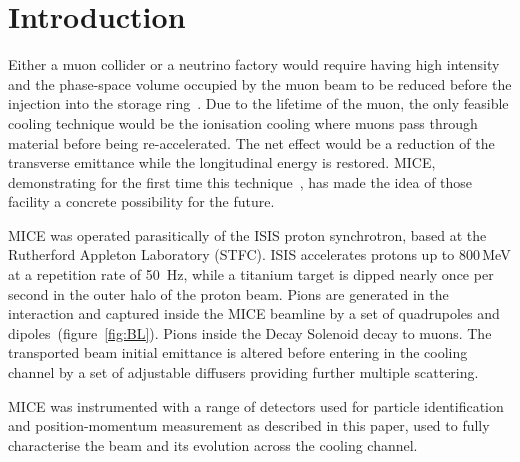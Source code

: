 \section{Introduction}
\label{Sect:Intro}

Either a muon collider or a neutrino factory would require having high intensity and the phase-space volume occupied by the muon beam to be reduced before the injection into the storage ring~\cite{Geer:1998PhRvD..57.6989G}.
Due to the lifetime of the muon, the only feasible cooling technique would be the ionisation cooling \cite{Neuffer:1983jr} where muons pass through material before being re-accelerated. The net effect would be a reduction of the transverse emittance while the longitudinal energy is restored.
MICE, demonstrating for the first time this technique~\cite{Bogomilov:2019kfj}, has made the idea of those facility a concrete possibility for the future.
  
  
  
MICE was operated parasitically of the ISIS proton synchrotron, based at the Rutherford Appleton Laboratory (STFC).
ISIS accelerates protons up to 800\,MeV at a repetition rate of 50~Hz, while a titanium target is dipped nearly once per second in the outer halo of the proton beam.
Pions are generated in the interaction and captured inside the MICE beamline by a set of quadrupoles and dipoles~(figure~\ref{fig:BL}). Pions inside the Decay Solenoid decay to muons.
The transported beam initial emittance is altered before entering in the cooling channel by a set of adjustable diffusers providing further multiple scattering.

MICE was instrumented with a range of detectors used for particle identification and position-momentum measurement as described in this paper, used to fully characterise the beam and its evolution across the cooling channel.
